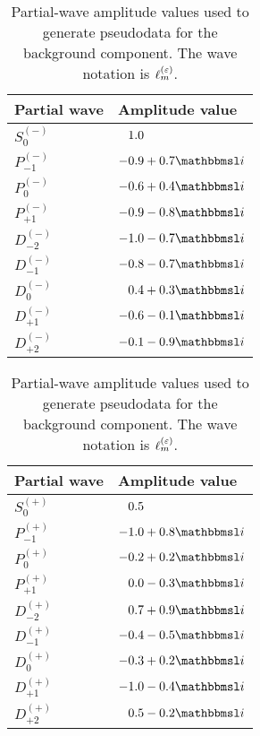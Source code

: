 \begin{table}[tbp]
  \centering%
  \renewcommand{\arraystretch}{1.2}%
  \caption{Partial-wave amplitude values used to generate pseudodata
  for the background component.  The wave notation is
  $\ell_m^{(\varepsilon)}$.}%
  \label{tab:photoprod_study_waveset_bkg}%
  \vspace*{1ex}%
  \hfill%
  \begin{tabular}{ll}
    \toprule
    \textbf{Partial wave} &
    \textbf{Amplitude value} \\
    \midrule
    $S_0^{(-)}$    & $\hphantom{-}1.0$ \\
    $P_{-1}^{(-)}$ & $-0.9 + 0.7 \imag$ \\
    $P_0^{(-)}$    & $-0.6 + 0.4 \imag$ \\
    $P_{+1}^{(-)}$ & $-0.9 - 0.8 \imag$ \\
    $D_{-2}^{(-)}$ & $-1.0 - 0.7 \imag$ \\
    $D_{-1}^{(-)}$ & $-0.8 - 0.7 \imag$ \\
    $D_0^{(-)}$    & $\hphantom{-}0.4 + 0.3 \imag$ \\
    $D_{+1}^{(-)}$ & $-0.6 - 0.1 \imag$ \\
    $D_{+2}^{(-)}$ & $-0.1 - 0.9 \imag$ \\
    \bottomrule
  \end{tabular}
  \hfill%
  \begin{tabular}{ll}
    \toprule
    \textbf{Partial wave} &
    \textbf{Amplitude value} \\
    \midrule
    $S_0^{(+)}$    & $\hphantom{-}0.5$ \\
    $P_{-1}^{(+)}$ & $-1.0 + 0.8 \imag$ \\
    $P_0^{(+)}$    & $-0.2 + 0.2 \imag$ \\
    $P_{+1}^{(+)}$ & $\hphantom{-}0.0 - 0.3 \imag$ \\
    $D_{-2}^{(+)}$ & $\hphantom{-}0.7 + 0.9 \imag$ \\
    $D_{-1}^{(+)}$ & $-0.4 - 0.5 \imag$ \\
    $D_0^{(+)}$    & $-0.3 + 0.2 \imag$ \\
    $D_{+1}^{(+)}$ & $-1.0 - 0.4 \imag$ \\
    $D_{+2}^{(+)}$ & $\hphantom{-}0.5 - 0.2 \imag$ \\
    \bottomrule
  \end{tabular}
  \hfill\null%
\end{table}

